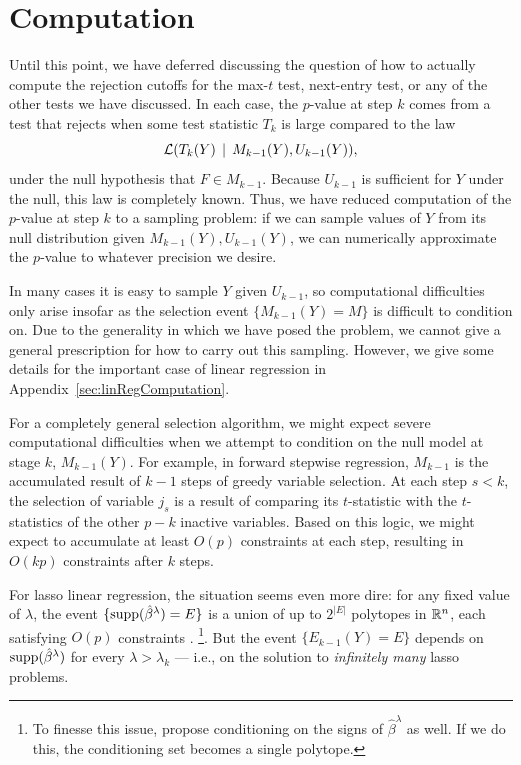 \documentclass{article}
\begin{document}
\section{Computation}
\label{sec:computation}

Until this point, we have deferred discussing the question of how to actually compute the rejection cutoffs for the max-$t$ test, next-entry test, or any of the other tests we have discussed. In each case, the $p$-value at step $k$ comes from a test that rejects when some test statistic $T_k$ is large compared to the law
\begin{equation}\label{eq:genDist}
\mathcal{L}(T_k(Y) \,\mid\, M_{k-1}(Y), U_{k-1}(Y)),
\end{equation}
under the null hypothesis that $F\in M_{k-1}$. Because $U_{k-1}$ is sufficient for $Y$ under the null, this law is completely known. Thus, we have reduced computation of the $p$-value at step $k$ to a sampling problem: if we can sample values of $Y$ from its null distribution given $M_{k-1}(Y), U_{k-1}(Y)$, we can numerically approximate the $p$-value to whatever precision we desire.

In many cases it is easy to sample $Y$ given $U_{k-1}$, so computational difficulties only arise insofar as the selection event $\{M_{k-1}(Y)=M\}$ is difficult to condition on. Due to the generality in which we have posed the problem, we cannot give a general prescription for how to carry out this sampling. However, we give some details for the important case of linear regression in Appendix~\ref{sec:linRegComputation}.

For a completely general selection algorithm, we might expect severe computational difficulties when we attempt to condition on the null model at stage $k$, $M_{k-1}(Y)$. For example, in forward stepwise regression, $M_{k-1}$ is the accumulated result of $k-1$ steps of greedy variable selection. At each step $s<k$, the selection of variable $j_s$ is a result of comparing its $t$-statistic with the $t$-statistics of the other $p-k$ inactive variables. Based on this logic, we might expect to accumulate at least $O(p)$ constraints at each step, resulting in $O(kp)$ constraints after $k$ steps.

For lasso linear regression, the situation seems even more dire: for any fixed value of $\lambda$, the event $\{\text{supp}(\hat\beta^\lambda) = E\}$ is a union of up to $2^{|E|}$ polytopes in $\mathbb{R}^n$, each satisfying $O(p)$ constraints \citep{lee2013exact}. \footnote{To finesse this issue, \citet{lee2013exact} propose conditioning on the signs of $\hat\beta^\lambda$ as well. If we do this, the conditioning set becomes a single polytope.}. But the event $\{E_{k-1}(Y)=E\}$ depends on $\text{supp}(\hat\beta^\lambda)$ for every $\lambda > \lambda_k$ --- i.e., on the solution to {\em infinitely many} lasso problems.
\end{document}
